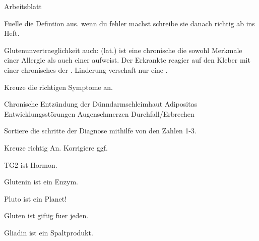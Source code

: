 \documentclass[11pt,twoside,a4paper]{exam}
\begin{document}
\begin{center}
  \huge{Arbeitsblatt}
\end{center}
\begin{center}





\end{center}
\vspace{0.1in}

\begin{questions}
\question Fuelle die Defintion aus.  wenn du fehler machst schreibe sie danach richtig ab ins Heft.

Glutenunvertraeglichkeit auch: \fillin(lat.) ist eine chronische \fillin die sowohl Merkmale einer Allergie als auch einer \fillin aufweist.
Der Erkrankte reagier \fillin auf den Kleber \fillin mit einer chronisches \fillin der \fillin. Linderung verschaft
nur eine \fillin.



\question
  Kreuze die richtigen Symptome an.
  \begin{checkboxes}
\choice Chronische Entzündung der Dünndarmschleimhaut
\choice Adipositas
\choice Entwicklungsstörungen
\choice Augenschmerzen
\choice Durchfall/Erbrechen
  \end{checkboxes}



  \question Sortiere die schritte der Diagnose mithilfe von den Zahlen 1-3.
  
  \begin{oneparcheckboxes}
  \end{oneparcheckboxes}

 Kreuze richtig An. Korrigiere ggf.
\begin{questions}
  \question TG2 ist Hormon.
    \begin{oneparcheckboxes}
  \end{oneparcheckboxes}
   \question Glutenin ist ein Enzym.
    \begin{oneparcheckboxes}
  \end{oneparcheckboxes}
  \question Pluto ist ein Planet!
   \begin{oneparcheckboxes}
  \end{oneparcheckboxes}
  \question Gluten ist giftig fuer jeden.
   \begin{oneparcheckboxes}
  \end{oneparcheckboxes}
  \question Gliadin ist ein Spaltprodukt.
      \begin{oneparcheckboxes}
  \end{oneparcheckboxes}
\end{questions}


\end{questions}
\end{document}
